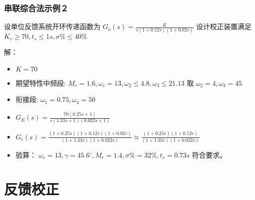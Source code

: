 \documentclass[table]{article}
\begin{document}
\begin{frame}
\frametitle{串联综合法示例２}
\label{sec-5-2-4}

设单位反馈系统开环传递函数为
$G_o(s)=\frac{K}{s(1+0.12s)(1+0.02s)}$ 设计校正装置满足 $K_v\geq 70,t_s\leq1s,\sigma\%\leq 40\%$

解：
\begin{itemize}
\item $K=70$
\item 期望特性中频段: $M_r=1.6,\omega_c=13,\omega_2\leq 4.8,\omega_3\leq 21.13$ 取 $\omega_2=4,\omega_3=45$
\item 衔接段:  $\omega_1=0.75,\omega_4=50$
\item $G_E(s)=\frac{70(0.25s+1)}{s(1.33s+1)(0.022s+1)}$
\item $G_c(s)=\frac{(1+0.25s)(1+0.12s)(1+0.02s)}{(1+1.33s)(1+0.022s)}\approx \frac{(1+0.25s)(1+0.12s)}{(1+1.33s)(1+0.022s)}$
\item 验算： $\omega_c=13,\gamma=45.6^{\circ},M_r=1.4,\sigma\%=32\%,t_s=0.73s$ 符合要求。
\end{itemize}
\end{frame}
\section{反馈校正}
\label{sec-6}
\end{document}
